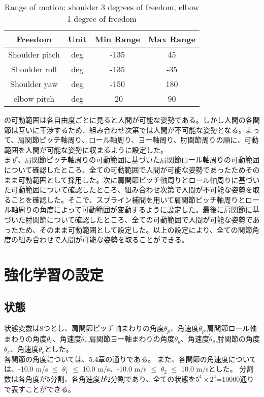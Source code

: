 
\begin{table}[tb]
  \begin{center}
    \caption{Range of motion: shoulder 3 degrees of freedom, elbow 1 degree of freedom}

    \begin{tabular}{c c c c}
      \hline
      Freedom & Unit & Min Range & Max Range \\
      \hline
      Shoulder pitch & deg & -135 & 45 \\
      Shoulder roll & deg & -135 & -35 \\
      Shoulder yaw & deg & -150 & 180 \\
      elbow pitch & deg & -20 & 90 \\
      \hline
    \end{tabular}
  \end{center}
\end{table}

の可動範囲は各自由度ごとに見ると人間が可能な姿勢である。しかし人間の各関節は互いに干渉するため、組み合わせ次第では人間が不可能な姿勢となる。よって、肩関節ピッチ軸周り、ロール軸周り、ヨー軸周り、肘関節周りの順に、可動範囲を人間が可能な姿勢に収まるように設定した。\\
まず、肩関節ピッチ軸周りの可動範囲に基づいた肩関節ロール軸周りの可動範囲について確認したところ、全ての可動範囲で人間が可能な姿勢であったためそのまま可動範囲として採用した。次に肩関節ピッチ軸周りとロール軸周りに基づいた可動範囲について確認したところ、組み合わせ次第で人間が不可能な姿勢を取ることを確認した。そこで、スプライン補間を用いて肩関節ピッチ軸周りとロール軸周りの角度によって可動範囲が変動するように設定した。最後に肩関節に基づいた肘関節について確認したところ、全ての可動範囲で人間が可能な姿勢であったため、そのまま可動範囲として設定した。以上の設定により、全ての関節角度の組み合わせで人間が可能な姿勢を取ることができる。

\section{強化学習の設定}
\subsection{状態}
状態変数は8つとし、肩関節ピッチ軸まわりの角度$\theta_{p}$、角速度$\dot{\theta}_{p}$,肩関節ロール軸まわりの角度$\theta_{r}$、角速度$\dot{\theta}_{r}$,肩関節ヨー軸まわりの角度$\theta_{y}$、角速度$\dot{\theta}_{y}$,肘関節の角度$\theta_{e}$、角速度$\dot{\theta}_{e}$とした。\\
各関節の角度については、5.4章の通りである。
また、各関節の角速度については、-10.0 m/s $\le$ $\dot{\theta}_{1}$ $\le$ 10.0 m/s、-10.0 m/s $\le$ $\dot{\theta}_{2}$ $\le$ 10.0 m/sとした。
分割数は各角度が5分割、各角速度が2分割であり、全ての状態を$5^{4}\times 2^{4}$=10000通りで表すことができる。
